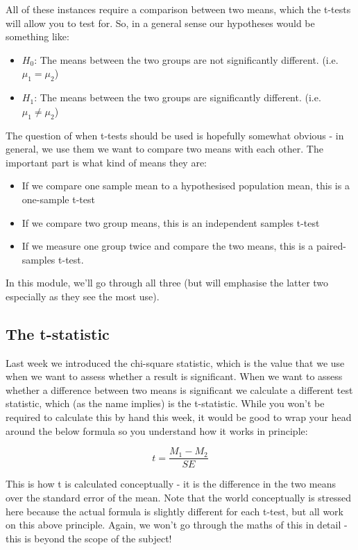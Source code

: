 \documentclass[
]{book}
\providecommand{\tightlist}{%
  \setlength{\itemsep}{0pt}\setlength{\parskip}{0pt}}
\begin{document}
All of these instances require a comparison between two means, which the t-tests will allow you to test for. So, in a general sense our hypotheses would be something like:

\begin{itemize}
\tightlist
\item
  \(H_0\): The means between the two groups are not significantly different. (i.e.~\(\mu_1 = \mu_2\))
\item
  \(H_1\): The means between the two groups are significantly different. (i.e.~\(\mu_1 \neq \mu_2\))
\end{itemize}

The question of when t-tests should be used is hopefully somewhat obvious - in general, we use them we want to compare two means with each other. The important part is what kind of means they are:

\begin{itemize}
\tightlist
\item
  If we compare one sample mean to a hypothesised population mean, this is a one-sample t-test
\item
  If we compare two group means, this is an independent samples t-test
\item
  If we measure one group twice and compare the two means, this is a paired-samples t-test.
\end{itemize}

In this module, we'll go through all three (but will emphasise the latter two especially as they see the most use).

\subsection{The t-statistic}\label{the-t-statistic}

Last week we introduced the chi-square statistic, which is the value that we use when we want to assess whether a result is significant. When we want to assess whether a difference between two means is significant we calculate a different test statistic, which (as the name implies) is the t-statistic. While you won't be required to calculate this by hand this week, it would be good to wrap your head around the below formula so you understand how it works in principle:

\[
t = \frac{M_1 - M_2}{SE}
\]

This is how t is calculated conceptually - it is the difference in the two means over the standard error of the mean. Note that the world conceptually is stressed here because the actual formula is slightly different for each t-test, but all work on this above principle. Again, we won't go through the maths of this in detail - this is beyond the scope of the subject!
\end{document}
